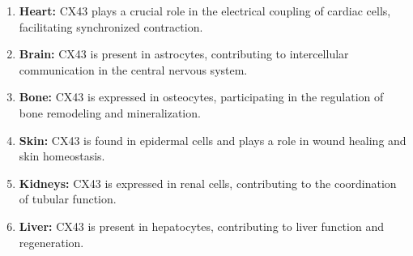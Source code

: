 \documentclass{article}
\begin{document}
\begin{enumerate}
  \item \textbf{Heart:} CX43 plays a crucial role in the electrical coupling of cardiac cells, facilitating synchronized contraction.
  
  \item \textbf{Brain:} CX43 is present in astrocytes, contributing to intercellular communication in the central nervous system.
  
  \item \textbf{Bone:} CX43 is expressed in osteocytes, participating in the regulation of bone remodeling and mineralization.
  
  \item \textbf{Skin:} CX43 is found in epidermal cells and plays a role in wound healing and skin homeostasis.
  
  \item \textbf{Kidneys:} CX43 is expressed in renal cells, contributing to the coordination of tubular function.
  
  \item \textbf{Liver:} CX43 is present in hepatocytes, contributing to liver function and regeneration.
\end{enumerate}
\end{document}
